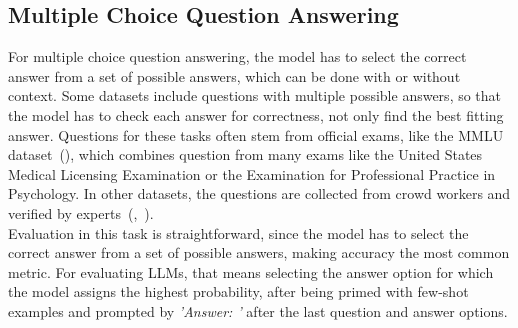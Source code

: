\subsection{Multiple Choice Question Answering}\label{multiple-choice-qa}
For multiple choice question answering, the model has to select the correct answer from a set of possible answers, which can be done with or without context.
Some datasets include questions with multiple possible answers, so that the model has to check each answer for correctness, not only find the best fitting answer.
Questions for these tasks often stem from official exams, like the MMLU dataset~(\cite{hendrycks:2020}), which combines question from many exams like the United States Medical Licensing Examination or the Examination for Professional Practice in Psychology.
In other datasets, the questions are collected from crowd workers and verified by experts~(\cite{clark:2018},~\cite{mihaylov:2018}).
\\
Evaluation in this task is straightforward, since the model has to select the correct answer from a set of possible answers, making accuracy the most common metric.
For evaluating LLMs, that means selecting the answer option for which the model assigns the highest probability, after being primed with few-shot examples and prompted by \emph{'Answer: '} after the last question and answer options.

